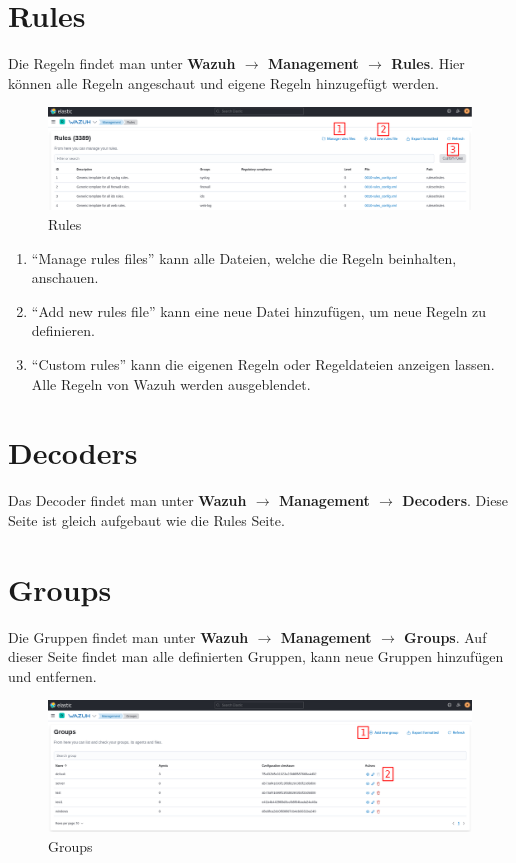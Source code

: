\section{Rules}
Die Regeln findet man unter \textbf{Wazuh $\rightarrow$ Management $\rightarrow$ Rules}.
Hier können alle Regeln angeschaut und eigene Regeln hinzugefügt werden. 

\begin{figure}[H]
    \centering
    \includegraphics[width=\linewidth]{../img/wazuh-rules.png}
    \caption{Rules}
\end{figure}

\begin{enumerate}
    \item ``Manage rules files'' kann alle Dateien, welche die Regeln beinhalten, anschauen. 
    \item ``Add new rules file'' kann eine neue Datei hinzufügen, um neue Regeln zu definieren.
    \item ``Custom rules'' kann die eigenen Regeln oder Regeldateien anzeigen lassen. Alle Regeln von Wazuh werden ausgeblendet.
\end{enumerate}

\section{Decoders}
Das Decoder findet man unter \textbf{Wazuh $\rightarrow$ Management $\rightarrow$ Decoders}.
Diese Seite ist gleich aufgebaut wie die Rules Seite.

\section{Groups}
Die Gruppen findet man unter \textbf{Wazuh $\rightarrow$ Management $\rightarrow$ Groups}.
Auf dieser Seite findet man alle definierten Gruppen, kann neue Gruppen hinzufügen und entfernen.

\begin{figure}[H]
    \centering
    \includegraphics[width=\linewidth]{../img/wazuh-groups.png}
    \caption{Groups}
\end{figure}

